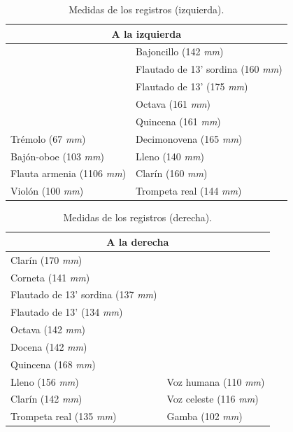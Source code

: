 \begin{table}[H]
	\begin{center}
		\begin{tabular}{|l|l|}
			\hline \multicolumn{2}{|c|}{\textbf{A la izquierda}} \\	
			\hline & Bajoncillo (142 \textit{mm}) \\ 
			\hline & Flautado de 13' sordina (160 \textit{mm}) \\ 
			\hline & Flautado de 13' (175 \textit{mm})\\ 
			\hline & Octava (161 \textit{mm}) \\ 
			\hline & Quincena (161 \textit{mm}) \\ 
			\hline Trémolo (67 \textit{mm}) & Decimonovena (165 \textit{mm}) \\ 
			\hline Bajón-oboe (103 \textit{mm}) & Lleno (140 \textit{mm})  \\ 
			\hline Flauta armenia (1106 \textit{mm}) & Clarín (160 \textit{mm}) \\ 
			\hline  Violón (100 \textit{mm}) & Trompeta real (144 \textit{mm})  \\ 
			\hline
		\end{tabular}
		\smallskip
		\caption{\label{tab:registros_izquierda} Medidas de los registros (izquierda).}
	\end{center}
\end{table}

\smallskip

\begin{table}[H]	
	\begin{center}
		\begin{tabular}{|l|l|}
			\hline \multicolumn{2}{|c|}{\textbf{A la derecha}} \\
			\hline Clarín (170 \textit{mm}) &  \\ 
			\hline Corneta (141 \textit{mm}) &  \\ 
			\hline Flautado de 13' sordina (137 \textit{mm}) &  \\ 
			\hline Flautado de 13' (134 \textit{mm}) &  \\ 
			\hline Octava (142 \textit{mm}) & \\ 
			\hline Docena (142 \textit{mm}) & \\ 
			\hline Quincena (168 \textit{mm}) & \\ 
			\hline Lleno (156 \textit{mm}) & Voz humana (110 \textit{mm}) \\ 
			\hline Clarín (142 \textit{mm}) & Voz celeste (116 \textit{mm}) \\ 
			\hline Trompeta real (135 \textit{mm}) & Gamba (102 \textit{mm}) \\ 
			\hline 
		\end{tabular}
		\smallskip
		\caption{\label{tab:registros_derecha} Medidas de los registros (derecha).}
	\end{center}
\end{table}

